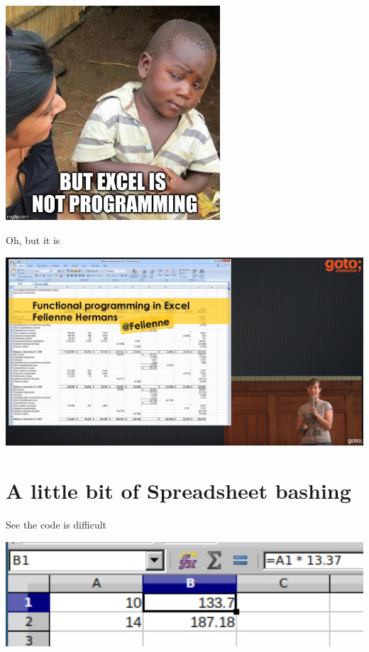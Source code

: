 \documentclass[aspectratio=169,notes]{beamer}
\begin{document}
	\begin{frame}[fragile]
		\begin{center}
		\includegraphics[width=0.6\textwidth]{skepical.jpg}
		\end{center}
	\end{frame}

	\begin{frame}[fragile]{Oh, but it is \hfill{} \cite{GOTO201638:online}}
		\begin{center}
		\includegraphics[width=1.0\textwidth]{functionalexcel.jpg}
		\end{center}
	\end{frame}

	\section{A little bit of Spreadsheet bashing}
	\begin{frame}[fragile]{See the code is difficult}
		\begin{center}
		\includegraphics[width=1.0\textwidth]{excelseeingcode.jpg}
		\end{center}
	\end{frame}
\end{document}
